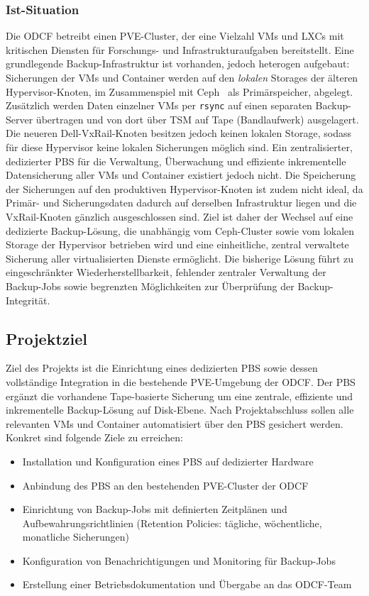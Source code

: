 \subsubsection{Ist-Situation}
Die \ac{ODCF} betreibt einen \ac{PVE}-Cluster, der eine Vielzahl
\acp{VM} und \acp{LXC} mit kritischen Diensten für Forschungs- und
Infrastrukturaufgaben bereitstellt.
Eine grundlegende Backup-Infrastruktur ist vorhanden, jedoch
heterogen aufgebaut: Sicherungen der \acp{VM} und Container werden
auf den \emph{lokalen} Storages der älteren Hypervisor-Knoten, im
Zusammenspiel mit Ceph~\citep{CephDocs} als Primärspeicher,
abgelegt. Zusätzlich werden Daten einzelner \acp{VM} per
\texttt{rsync} auf einen separaten Backup-Server übertragen und von
dort über \ac{TSM} auf Tape (Bandlaufwerk) ausgelagert.
Die neueren Dell-VxRail-Knoten besitzen jedoch keinen lokalen
Storage, sodass für diese Hypervisor keine lokalen Sicherungen
möglich sind.
Ein zentralisierter, dedizierter \acl{PBS} für die Verwaltung, Überwachung
und effiziente inkrementelle Datensicherung aller \acp{VM} und Container
existiert jedoch nicht.
Die Speicherung der Sicherungen auf den produktiven Hypervisor-Knoten
ist zudem nicht ideal, da Primär- und Sicherungsdaten dadurch auf
derselben Infrastruktur liegen und die VxRail-Knoten gänzlich
ausgeschlossen sind.
Ziel ist daher der Wechsel auf eine dedizierte Backup-Lösung, die
unabhängig vom Ceph-Cluster sowie vom lokalen Storage der
Hypervisor betrieben wird und eine einheitliche, zentral verwaltete
Sicherung aller virtualisierten Dienste ermöglicht.
Die bisherige Lösung führt zu eingeschränkter Wiederherstellbarkeit,
fehlender zentraler Verwaltung der Backup-Jobs sowie begrenzten
Möglichkeiten zur Überprüfung der Backup-Integrität.

\subsection{Projektziel}
\label{sec:Projektziel}
Ziel des Projekts ist die Einrichtung eines dedizierten \acl{PBS} sowie
dessen vollständige Integration in die bestehende \ac{PVE}-Umgebung der
\ac{ODCF}.
Der \ac{PBS} ergänzt die vorhandene Tape-basierte Sicherung um eine
zentrale, effiziente und inkrementelle Backup-Lösung auf Disk-Ebene.
Nach Projektabschluss sollen alle relevanten \acp{VM} und Container
automatisiert über den \ac{PBS} gesichert werden.
Konkret sind folgende Ziele zu erreichen:
\begin{itemize}
    \item Installation und Konfiguration eines \acl{PBS} auf dedizierter Hardware
    \item Anbindung des \ac{PBS} an den bestehenden \ac{PVE}-Cluster der \ac{ODCF}
    \item Einrichtung von Backup-Jobs mit definierten Zeitplänen und Aufbewahrungsrichtlinien (Retention Policies: tägliche, wöchentliche, monatliche Sicherungen)
    \item Konfiguration von Benachrichtigungen und Monitoring für Backup-Jobs
    \item Erstellung einer Betriebsdokumentation und Übergabe an das \ac{ODCF}-Team
\end{itemize}

